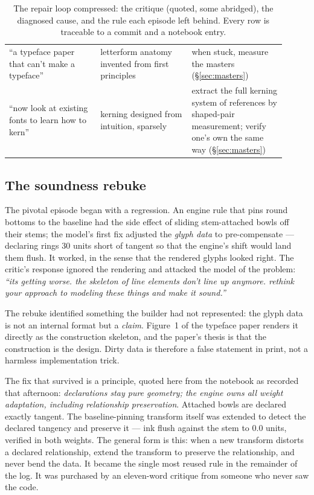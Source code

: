 \documentclass[12pt]{article}
\begin{document}
\begin{table}[t]
\begin{tabular}{p{0.30\linewidth}p{0.30\linewidth}p{0.31\linewidth}}
``a typeface paper that can't make a typeface'' & letterform anatomy invented from first principles & when stuck, measure the masters (§\ref{sec:masters}) \\
``now look at existing fonts to learn how to kern'' & kerning designed from intuition, sparsely & extract the full kerning system of references by shaped-pair measurement; verify one's own the same way (§\ref{sec:masters}) \\
\bottomrule
\end{tabular}
\caption{The repair loop compressed: the critique (quoted, some abridged), the diagnosed cause, and the rule each episode left behind. Every row is traceable to a commit and a notebook entry.}
\label{tab:episodes}
\end{table}

\subsection{The soundness rebuke}\label{sec:sound}

The pivotal episode began with a regression. An engine rule that pins round bottoms to the baseline had the side effect of sliding stem-attached bowls off their stems; the model's first fix adjusted the \emph{glyph data} to pre-compensate — declaring rings 30 units short of tangent so that the engine's shift would land them flush. It worked, in the sense that the rendered glyphs looked right. The critic's response ignored the rendering and attacked the model of the problem: \emph{``its getting worse. the skeleton of line elements don't line up anymore. rethink your approach to modeling these things and make it sound.''}

The rebuke identified something the builder had not represented: the glyph data is not an internal format but a \emph{claim}. Figure~1 of the typeface paper renders it directly as the construction skeleton, and the paper's thesis is that the construction is the design. Dirty data is therefore a false statement in print, not a harmless implementation trick.

The fix that survived is a principle, quoted here from the notebook as recorded that afternoon: \emph{declarations stay pure geometry; the engine owns all weight adaptation, including relationship preservation}. Attached bowls are declared exactly tangent. The baseline-pinning transform itself was extended to detect the declared tangency and preserve it — ink flush against the stem to $0.0$ units, verified in both weights. The general form is this: when a new transform distorts a declared relationship, extend the transform to preserve the relationship, and never bend the data. It became the single most reused rule in the remainder of the log. It was purchased by an eleven-word critique from someone who never saw the code.
\end{document}
